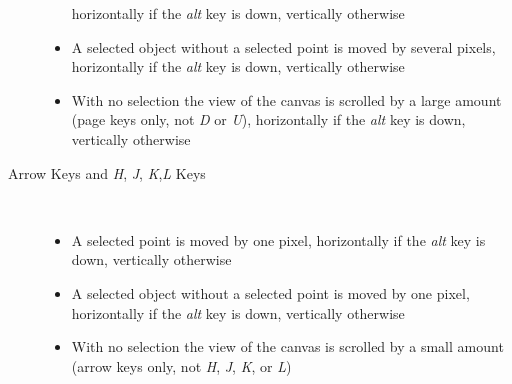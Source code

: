 \begin{description}
\begin{itemize}
		        horizontally if the \emph{alt} key is down,
		        vertically otherwise
		      \item A selected object without a
		        selected point is moved by several pixels,
		        horizontally if the \emph{alt} key is down,
		        vertically otherwise
		      \item With no selection the view of the canvas
		        is scrolled by a large amount
		        (page keys only, not
		        \emph{D} or \emph{U}),
		        horizontally if the \emph{alt} key is down,
		        vertically otherwise
		    \end{itemize}
		  \item[Arrow Keys and \emph{H},
		  \emph{J}, \emph{K},\emph{L} Keys] \hfill \\
		    \begin{itemize}
		      \item A selected point
		        is moved by one pixel,
		        horizontally if the \emph{alt} key is down,
		        vertically otherwise
		      \item A selected object without a
		        selected point is moved by one pixel,
		        horizontally if the \emph{alt} key is down,
		        vertically otherwise
		      \item With no selection the view of the canvas
		        is scrolled by a small amount
		        (arrow keys only, not
		        \emph{H}, \emph{J}, \emph{K}, or \emph{L})
		    \end{itemize}
		\end{description}

















